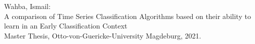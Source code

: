 \documentclass{report}
\begin{document}

\small
\vspace*{\fill}
{\raggedright
Wahba, Ismail:\\
A comparison of Time Series Classification Algorithms based on their
ability to learn in an Early Classification Context \\ Master Thesis, Otto-von-Guericke-University Magdeburg, 2021. 
}

\thispagestyle{empty}
\null\newpage

\null\newpage

\null\newpage


\end{document}
